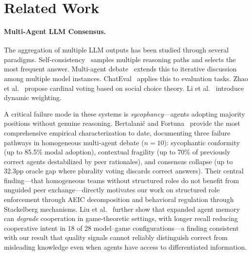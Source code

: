 \section{Related Work}
\label{sec:related}

\paragraph{Multi-Agent LLM Consensus.}
The aggregation of multiple LLM outputs has been studied through several paradigms. Self-consistency~\cite{wang2023selfconsistency} samples multiple reasoning paths and selects the most frequent answer. Multi-agent debate~\cite{du2024improving,choi2025debate} extends this to iterative discussion among multiple model instances. ChatEval~\cite{chan2023chateval} applies this to evaluation tasks. Zhao et al.~\cite{zhao2024electoral} propose cardinal voting based on social choice theory. Li et al.~\cite{li2025dynamic} introduce dynamic weighting.

A critical failure mode in these systems is \emph{sycophancy}---agents adopting majority positions without genuine reasoning. Bertalani\v{c} and Fortuna~\cite{bertalanic2026cost} provide the most comprehensive empirical characterization to date, documenting three failure pathways in homogeneous multi-agent debate ($n{=}10$): sycophantic conformity (up to 85.5\% modal adoption), contextual fragility (up to 70\% of previously correct agents destabilized by peer rationales), and consensus collapse (up to 32.3pp oracle gap where plurality voting discards correct answers). Their central finding---that homogeneous teams without structured roles do not benefit from unguided peer exchange---directly motivates our work on structured role enforcement through AEIC decomposition and behavioral regulation through Stackelberg mechanisms. Liu et al.~\cite{liu2025memorycurse} further show that expanded agent memory can \emph{degrade} cooperation in game-theoretic settings, with longer recall reducing cooperative intent in 18 of 28 model--game configurations---a finding consistent with our result that quality signals cannot reliably distinguish correct from misleading knowledge even when agents have access to differentiated information.

